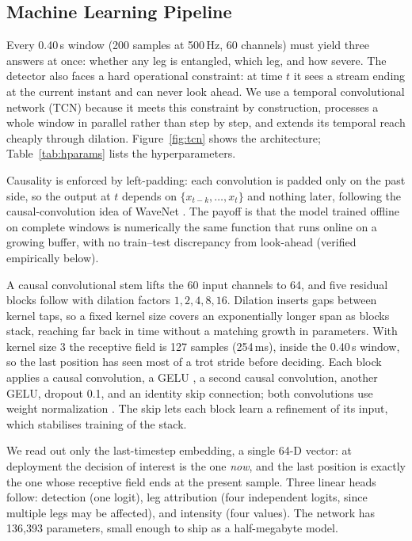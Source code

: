 \subsection{Machine Learning Pipeline}

Every 0.40\,s window (200 samples at 500\,Hz, 60 channels) must yield three answers at once: whether any leg is entangled, which leg, and how severe. The detector also faces a hard operational constraint: at time $t$ it sees a stream ending at the current instant and can never look ahead. We use a temporal convolutional network (TCN) \cite{bai2018tcn} because it meets this constraint by construction, processes a whole window in parallel rather than step by step, and extends its temporal reach cheaply through dilation. Figure~\ref{fig:tcn} shows the architecture; Table~\ref{tab:hparams} lists the hyperparameters.

Causality is enforced by left-padding: each convolution is padded only on the past side, so the output at $t$ depends on $\{x_{t-k},\dots,x_t\}$ and nothing later, following the causal-convolution idea of WaveNet \cite{oord2016wavenet}. The payoff is that the model trained offline on complete windows is numerically the same function that runs online on a growing buffer, with no train--test discrepancy from look-ahead (verified empirically below).

A causal convolutional stem lifts the 60 input channels to 64, and five residual blocks follow with dilation factors $1,2,4,8,16$. Dilation inserts gaps between kernel taps, so a fixed kernel size covers an exponentially longer span as blocks stack, reaching far back in time without a matching growth in parameters. With kernel size 3 the receptive field is 127 samples (254\,ms), inside the 0.40\,s window, so the last position has seen most of a trot stride before deciding. Each block applies a causal convolution, a GELU \cite{hendrycks2016gelu}, a second causal convolution, another GELU, dropout 0.1, and an identity skip connection; both convolutions use weight normalization \cite{salimans2016weightnorm}. The skip lets each block learn a refinement of its input, which stabilises training of the stack.

We read out only the last-timestep embedding, a single 64-D vector: at deployment the decision of interest is the one \emph{now}, and the last position is exactly the one whose receptive field ends at the present sample. Three linear heads follow: detection (one logit), leg attribution (four independent logits, since multiple legs may be affected), and intensity (four values). The network has 136{,}393 parameters, small enough to ship as a half-megabyte model.

